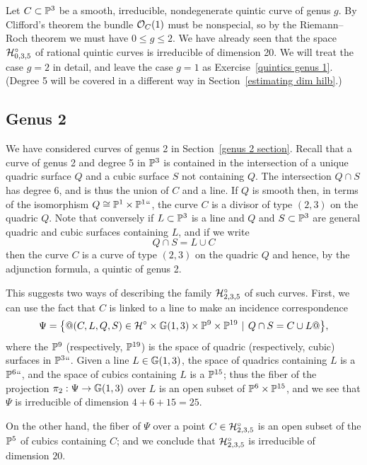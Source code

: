 Let $C \subset {\mathbb P}^3$ be a smooth, irreducible, nondegenerate quintic
curve of genus $g$. By Clifford's theorem the bundle ${\mathcal O}_C(1)$ must
be nonspecial, so  by the Riemann--Roch theorem we must have $0\leq
g \leq 2$. We have already seen that the space $\mathcal H^\circ_{0,3,5}$
%
of rational quintic curves is irreducible of dimension 20. We
will treat the case $g=2$ in detail, and leave the case $g=1$ as
Exercise~\ref{quintics genus 1}. (Degree 5 will be covered in a different
way in Section~\ref{estimating dim hilb}.)

\subsection*{Genus 2}

We have considered curves of genus 2 in Section~\ref{genus 2 section}.
Recall that a curve of genus 2 and degree 5 in
${\mathbb P}^3$ is contained in the intersection of a unique quadric surface $Q$
and a cubic surface $S$ not containing $Q$.
The intersection $Q\cap S$
has degree 6, and is thus the union of $C$ and a line. If $Q$ is smooth
then, in terms of the isomorphism $Q \cong {\mathbb P}^1 \times {\mathbb P}^1` `$, the
curve $C$ is a divisor of type $(2,3)$ on the quadric $Q$. Note that
conversely if $L \subset {\mathbb P}^3$ is a line and $Q$ and $S \subset {\mathbb P}^3$
are general quadric and cubic surfaces containing $L$, and if we write
$$
Q \cap S = L \cup C
$$
then the curve $C$ is a curve of type $(2,3)$ on the quadric $Q$ and
hence, by the adjunction formula,
 a quintic of genus 2.

This suggests two ways of describing the family $\mathcal H^\circ_{2,3,5}$ of
%
such curves. First, we can use the fact that $C$ is linked to a line to
make an incidence correspondence
$$
\Psi = \bigl\{@(C, L, Q, S) \in \cH^\circ \times \GG(1,3) \times \PP^9 \times
\PP^{19} \; \mid \; Q \cap S = C \cup L@\bigr\},
$$
where the ${\mathbb P}^9$ (respectively, ${\mathbb P}^{19}$) is the space of quadric
(respectively, cubic) surfaces in ${\mathbb P}^3` `$. Given a line $L \in {\mathbb G}(1,3)$,
the space of quadrics containing $L$ is a ${\mathbb P}^6` `$, and the space of cubics
containing $L$ is a ${\mathbb P}^{15}$; thus the fiber of the projection $\pi_2 :
\Psi \to {\mathbb G}(1,3)$ over $L$ is an open subset of ${\mathbb P}^6 \times {\mathbb P}^{15}$,
and we see that $\Psi$ is irreducible of dimension $4 + 6 + 15 = 25$.

On the other hand, the fiber of $\Psi$ over a point $C \in
\mathcal H^\circ_{2,3,5}$ is an open subset of the ${\mathbb P}^5$ of cubics containing
$C$; and we conclude that $\mathcal H^\circ_{2,3,5}$ is irreducible of dimension
$20$.

